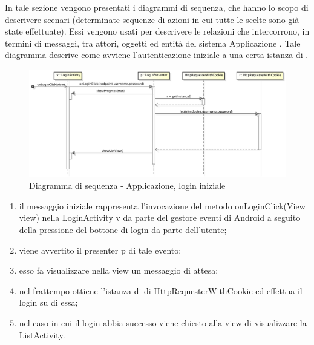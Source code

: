 \begin{itemize}
        In tale sezione vengono presentati i diagrammi di sequenza, che hanno lo scopo di descrivere scenari (determinate sequenze di azioni in cui tutte le scelte sono già state effettuate). Essi vengono usati per descrivere le relazioni che intercorrono, in termini di messaggi, tra attori, oggetti ed entità del sistema Applicazione .
            Tale diagramma descrive come avviene l'autenticazione iniziale a una certa istanza di .
            \begin{figure}[H]
                \centering
                \includegraphics[scale=0.3]{DefinizioneDiProdotto/Pics/ApplicazioneLogin}
                \caption{Diagramma di sequenza - Applicazione, login iniziale}
            \end{figure}
            \begin{enumerate}
                \item il messaggio iniziale rappresenta l'invocazione del metodo onLoginClick(View view) nella LoginActivity v da parte del gestore eventi di Android a seguito della pressione del bottone di login da parte dell'utente;
                \item viene avvertito il presenter p di tale evento;
                \item esso fa visualizzare nella view un messaggio di attesa;
                \item nel frattempo ottiene l'istanza di di HttpRequesterWithCookie ed effettua il login su di essa;
                \item nel caso in cui il login abbia successo viene chiesto alla view di visualizzare la ListActivity.
            \end{enumerate}


\end{itemize}
